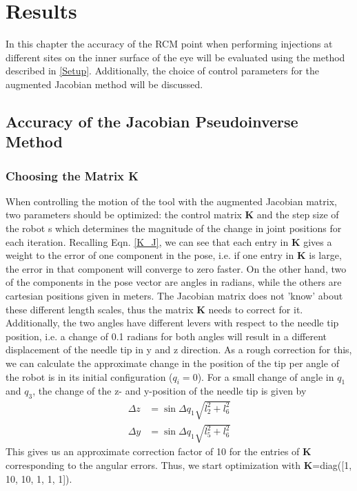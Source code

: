\chapter{Results}

In this chapter the accuracy of the RCM point when performing injections at different sites on the inner surface of the eye will be evaluated using the method described in \ref{Setup}. Additionally, the choice of control parameters for the augmented Jacobian method will be discussed.

\section{Accuracy of the Jacobian Pseudoinverse Method} \label{Acc_PI}

\subsection{Choosing the Matrix K} \label{K}
When controlling the motion of the tool with the augmented Jacobian matrix, two parameters should be optimized: the control matrix \textbf{K} and the step size of the robot s which determines the magnitude of the change in joint positions for each iteration. Recalling Eqn. \ref{K_J}, we can see that each entry in \textbf{K} gives a weight to the error of one component in the pose, i.e. if one entry in \textbf{K} is large, the error in that component will converge to zero faster. On the other hand, two of the components in the pose vector are angles in radians, while the others are cartesian positions given in meters. The Jacobian matrix does not 'know' about these different length scales, thus the matrix \textbf{K} needs to correct for it. Additionally, the two angles have different levers with respect to the needle tip position, i.e. a change of 0.1 radians for both angles will result in a different displacement of the needle tip in y and z direction.  As a rough correction for this, we can calculate the approximate change in the position of the tip per angle of the robot is in its initial configuration ($q_i = 0$). 
For a small change of angle in $q_1$ and $q_3$, the change of the z- and y-position of the needle tip is given by 
\begin{align*}
\Delta z&=\sin\Delta q_1 \sqrt{l_2^2+l_6^2}\\
\Delta y&=\sin\Delta q_1 \sqrt{l_5^2+l_6^2}
\end{align*}
This gives us an approximate correction factor of 10 for the entries of \textbf{K} corresponding to the angular errors. Thus, we start optimization with \textbf{K}=diag([1, 10, 10, 1, 1, 1]). 

